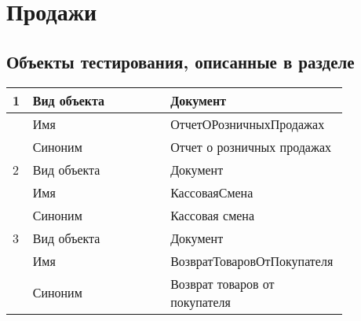 \section{Продажи}
\subsection{Объекты тестирования, описанные в разделе}

\begin{tabular}{p{0.05\linewidth}p{0.4\linewidth}p{0.4\linewidth}}
    \toprule
    1 & Вид объекта & Документ \\
    \hline
    & Имя & ОтчетОРозничныхПродажах \\
    \hline
    & Синоним  & Отчет о розничных продажах \\
    \hline
    2 & Вид объекта  & Документ \\
    \hline
    & Имя & КассоваяСмена \\
    \hline
    & Синоним  & Кассовая смена \\
    \hline
    3 & Вид объекта  & Документ \\
    \hline
    & Имя & ВозвратТоваровОтПокупателя \\
    \hline
    & Синоним  & Возврат товаров от покупателя \\
    \hline

    \bottomrule %
\end{tabular}